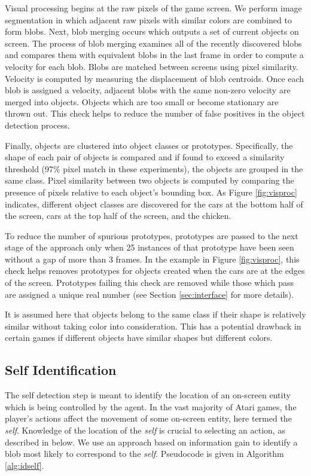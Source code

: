 \documentclass{acm_proc_article-sp}
\begin{document}
Visual processing begins at the raw pixels of the game screen. We perform image segmentation in which adjacent raw pixels with similar colors are combined to form blobs. Next, blob merging occurs which outputs a set of current objects on screen. The process of blob merging examines all of the recently discovered blobs and compares them with equivalent blobs in the last frame in order to compute a velocity for each blob. Blobs are matched between screens using pixel similarity. Velocity is computed by measuring the displacement of blob centroids. Once each blob is assigned a velocity, adjacent blobs with the same non-zero velocity are merged into objects. Objects which are too small or become stationary are thrown out. This check helps to reduce the number of false positives in the object detection process.

Finally, objects are clustered into object classes or prototypes. Specifically, the shape of each pair of objects is compared and if found to exceed a similarity threshold (97\% pixel match in these experiments), the objects are grouped in the same class. Pixel similarity between two objects is computed by comparing the presence of pixels relative to each object's bounding box. As Figure \ref{fig:visproc} indicates, different object classes are discovered for the cars at the bottom half of the screen, cars at the top half of the screen, and the chicken. 

To reduce the number of spurious prototypes, prototypes are passed to the next stage of the approach only when 25 instances of that prototype have been seen without a gap of more than 3 frames. In the example in Figure \ref{fig:visproc}, this check helps removes prototypes for objects created when the cars are at the edges of the screen. Prototypes failing this check are removed while those which pass are assigned a unique real number (see Section \ref{sec:interface} for more details).

It is assumed here that objects belong to the same class if their shape is relatively similar without taking color into consideration. This has a potential drawback in certain games if different objects have similar shapes but different colors. 

\subsection{Self Identification}
The self detection step is meant to identify the location of an on-screen entity which is being controlled by the agent. In the vast majority of Atari games, the player's actions affect the movement of some on-screen entity, here termed the \textit{self}. Knowledge of the location of the \textit{self} is crucial to selecting an action, as described in below. We use an approach based on information gain to identify a blob most likely to correspond to the \textit{self}. Pseudocode is given in Algorithm \ref{alg:idself}.
\end{document}

